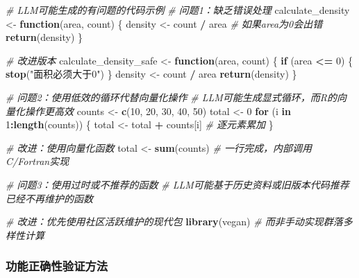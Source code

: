 \documentclass[
  twoside,12pt,fontset=none]{ctexbook}
\newenvironment{Shaded}{\begin{snugshade}}{\end{snugshade}}
\newcommand{\CommentTok}[1]{\textcolor[rgb]{0.56,0.35,0.01}{\textit{#1}}}
\newcommand{\ControlFlowTok}[1]{\textcolor[rgb]{0.13,0.29,0.53}{\textbf{#1}}}
\newcommand{\DecValTok}[1]{\textcolor[rgb]{0.00,0.00,0.81}{#1}}
\newcommand{\FunctionTok}[1]{\textcolor[rgb]{0.13,0.29,0.53}{\textbf{#1}}}
\newcommand{\NormalTok}[1]{#1}
\newcommand{\OtherTok}[1]{\textcolor[rgb]{0.56,0.35,0.01}{#1}}
\newcommand{\SpecialCharTok}[1]{\textcolor[rgb]{0.81,0.36,0.00}{\textbf{#1}}}
\newcommand{\StringTok}[1]{\textcolor[rgb]{0.31,0.60,0.02}{#1}}
\begin{document}
\begin{Shaded}
\begin{Highlighting}[]
\CommentTok{\# LLM可能生成的有问题的代码示例}
\CommentTok{\# 问题1：缺乏错误处理}
\NormalTok{calculate\_density }\OtherTok{\textless{}{-}} \ControlFlowTok{function}\NormalTok{(area, count) \{}
\NormalTok{  density }\OtherTok{\textless{}{-}}\NormalTok{ count }\SpecialCharTok{/}\NormalTok{ area }\CommentTok{\# 如果area为0会出错}
  \FunctionTok{return}\NormalTok{(density)}
\NormalTok{\}}

\CommentTok{\# 改进版本}
\NormalTok{calculate\_density\_safe }\OtherTok{\textless{}{-}} \ControlFlowTok{function}\NormalTok{(area, count) \{}
  \ControlFlowTok{if}\NormalTok{ (area }\SpecialCharTok{\textless{}=} \DecValTok{0}\NormalTok{) \{}
    \FunctionTok{stop}\NormalTok{(}\StringTok{"面积必须大于0"}\NormalTok{)}
\NormalTok{  \}}
\NormalTok{  density }\OtherTok{\textless{}{-}}\NormalTok{ count }\SpecialCharTok{/}\NormalTok{ area}
  \FunctionTok{return}\NormalTok{(density)}
\NormalTok{\}}

\CommentTok{\# 问题2：使用低效的循环代替向量化操作}
\CommentTok{\# LLM可能生成显式循环，而R的向量化操作更高效}
\NormalTok{counts }\OtherTok{\textless{}{-}} \FunctionTok{c}\NormalTok{(}\DecValTok{10}\NormalTok{, }\DecValTok{20}\NormalTok{, }\DecValTok{30}\NormalTok{, }\DecValTok{40}\NormalTok{, }\DecValTok{50}\NormalTok{)}
\NormalTok{total }\OtherTok{\textless{}{-}} \DecValTok{0}
\ControlFlowTok{for}\NormalTok{ (i }\ControlFlowTok{in} \DecValTok{1}\SpecialCharTok{:}\FunctionTok{length}\NormalTok{(counts)) \{}
\NormalTok{  total }\OtherTok{\textless{}{-}}\NormalTok{ total }\SpecialCharTok{+}\NormalTok{ counts[i]  }\CommentTok{\# 逐元素累加}
\NormalTok{\}}

\CommentTok{\# 改进：使用向量化函数}
\NormalTok{total }\OtherTok{\textless{}{-}} \FunctionTok{sum}\NormalTok{(counts)  }\CommentTok{\# 一行完成，内部调用C/Fortran实现}

\CommentTok{\# 问题3：使用过时或不推荐的函数}
\CommentTok{\# LLM可能基于历史资料或旧版本代码推荐已经不再维护的函数}

\CommentTok{\# 改进：优先使用社区活跃维护的现代包}
\FunctionTok{library}\NormalTok{(vegan)  }\CommentTok{\# 而非手动实现群落多样性计算}
\end{Highlighting}
\end{Shaded}

\hypertarget{ux529fux80fdux6b63ux786eux6027ux9a8cux8bc1ux65b9ux6cd5}{%
\subsubsection{功能正确性验证方法}\label{ux529fux80fdux6b63ux786eux6027ux9a8cux8bc1ux65b9ux6cd5}}
\end{document}

